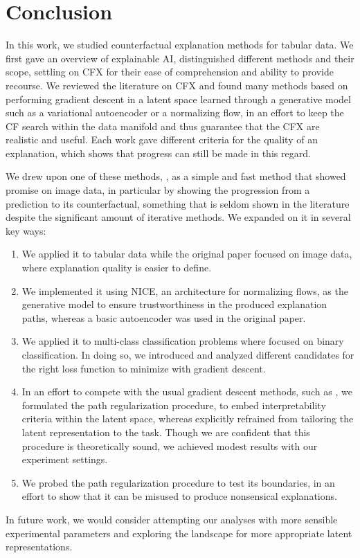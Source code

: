 \documentclass[../main.tex]{subfiles}
\begin{document}
\chapter{Conclusion}
\label{ch:conclusion}

In this work, we studied counterfactual explanation methods for tabular data.
We first gave an overview of explainable AI, distinguished different methods and their scope, settling on CFX for their ease of comprehension and ability to provide recourse.
We reviewed the literature on CFX and found many methods based on performing gradient descent in a latent space learned through a generative model such as a variational autoencoder or a normalizing flow, in an effort to keep the CF search within the data manifold and thus guarantee that the CFX are realistic and useful.
Each work gave different criteria for the quality of an explanation, which shows that progress can still be made in this regard.

We drew upon one of these methods, \ls{}, as a simple and fast method that showed promise on image data, in particular
by showing the progression from a prediction to its counterfactual, something that is seldom shown in the literature
despite the significant amount of iterative methods.
We expanded on it in several key ways:
\begin{enumerate}
    \item We applied it to tabular data while the original \ls{} paper focused on image data, where explanation quality is easier to define.
    \item We implemented it using NICE, an architecture for normalizing flows, as the generative model to ensure trustworthiness in the produced explanation paths, whereas a basic autoencoder was used in the original \ls{} paper.
    \item We applied it to multi-class classification problems where \citeauthor{cohenGifsplanation2022} focused on binary classification. In doing so, we introduced and analyzed different candidates for the right loss function to minimize with gradient descent.
    \item In an effort to compete with the usual gradient descent methods, such as \revise{} \cite{joshiRealistic2019}, we formulated the path regularization procedure, to embed interpretability criteria within the latent space, whereas \citeauthor{cohenGifsplanation2022} explicitly refrained from tailoring the latent representation to the task.
    Though we are confident that this procedure is theoretically sound, we achieved modest results with our experiment settings.
    \item We probed the path regularization procedure to test its boundaries, in an effort to show that it can be misused to produce nonsensical explanations.
\end{enumerate}

In future work, we would consider attempting our analyses with more sensible experimental parameters
and exploring the landscape for more appropriate latent representations.
\end{document}

